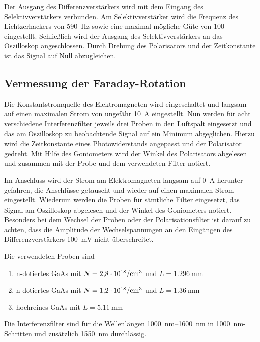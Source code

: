 Der Ausgang des Differenzverstärkers wird mit dem Eingang des
Selektivverstärkers verbunden. Am Selektivverstärker wird die
Frequenz des Lichtzerhackers von \SI{590}{\hertz} sowie eine
maximal mögliche Güte von \num{100} eingestellt.
Schließlich wird der Ausgang des Selektivverstärkers an das Oszilloskop
angeschlossen. Durch Drehung des Polarisators und der Zeitkonstante
ist das Signal auf Null abzugleichen.


\subsection{Vermessung der Faraday-Rotation}
\label{sec:MessungFaraday}

Die Konstantstromquelle des Elektromagneten wird eingeschaltet und
langsam auf einen maximalen Strom von ungefähr \SI{10}{\ampere}
eingestellt. Nun werden für acht verschiedene Interferenzfilter
jeweils drei Proben in den Luftspalt eingesetzt und
das am Oszilloskop zu beobachtende Signal auf ein Minimum abgeglichen.
Hierzu wird die Zeitkonstante eines Photowiderstands angepasst und
der Polarisator gedreht. Mit Hilfe des Goniometers wird der Winkel
des Polarisators abgelesen und zusammen mit der Probe und dem verwendeten
Filter notiert.

Im Anschluss wird der Strom am Elektromagneten langsam auf \SI{0}{\ampere}
herunter gefahren, die Anschlüsse getauscht und wieder auf einen maximalen
Strom eingestellt. Wiederum werden die Proben für sämtliche Filter
eingesetzt, das Signal am Oszilloskop abgelesen und der Winkel des
Goniometers notiert.
Besonders bei dem Wechsel der Proben oder der Polarisationsfilter
ist darauf zu achten, dass die Amplitude der Wechselspannungen an den
Eingängen des Differenzverstärkers \SI{100}{\milli\volt} nicht
überschreitet.

Die verwendeten Proben sind
\begin{enumerate}
  \item n-dotiertes GaAs mit
  $N = \SI{2.8e18}{\raiseto{-3}\centi\meter}$ und
  $L = \SI{1.296}{\milli\meter}$
  \item n-dotiertes GaAs mit
  $N = \SI{1.2e18}{\raiseto{-3}\centi\meter}$ und
  $L = \SI{1.36}{\milli\meter}$
  \item hochreines GaAs mit
  $L = \SI{5.11}{\milli\meter}$
\end{enumerate}
Die Interferenzfilter sind für die Wellenlängen
\SIrange{1000}{1600}{\nano\meter} in \SI{1000}{\nano\meter}-Schritten
und zusätzlich \SI{1550}{\nano\meter} durchlässig.
